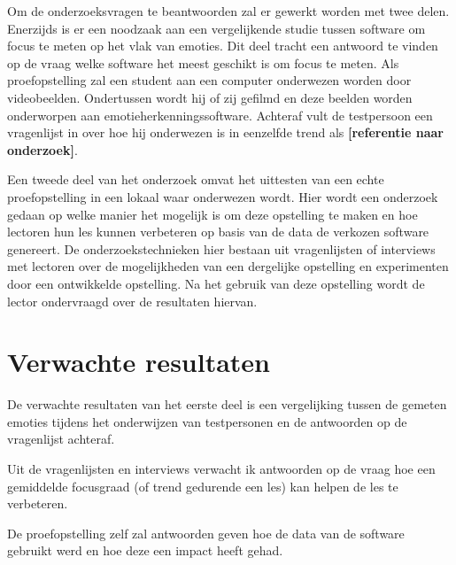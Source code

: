 Om de onderzoeksvragen te beantwoorden zal er gewerkt worden met twee delen. Enerzijds is er een noodzaak aan een vergelijkende studie tussen software om focus te meten op het vlak van emoties. Dit deel tracht een antwoord te vinden op de vraag welke software het meest geschikt is om focus te meten. Als proefopstelling zal een student aan een computer onderwezen worden door videobeelden. Ondertussen wordt hij of zij gefilmd en deze beelden worden onderworpen aan emotieherkenningssoftware. Achteraf vult de testpersoon een vragenlijst in over hoe hij onderwezen is in eenzelfde trend als \textbf{[referentie naar onderzoek]}.

Een tweede deel van het onderzoek omvat het uittesten van een echte proefopstelling in een lokaal waar onderwezen wordt. Hier wordt een onderzoek gedaan op welke manier het mogelijk is om deze opstelling te maken en hoe lectoren hun les kunnen verbeteren op basis van de data de verkozen software genereert. De onderzoekstechnieken hier bestaan uit vragenlijsten of interviews met lectoren over de mogelijkheden van een dergelijke opstelling en experimenten door een ontwikkelde opstelling. Na het gebruik van deze opstelling wordt de lector ondervraagd over de resultaten hiervan.


\section{Verwachte resultaten}
\label{sec:verwachte_resultaten}



De verwachte resultaten van het eerste deel is een vergelijking tussen de gemeten emoties tijdens het onderwijzen van testpersonen en de antwoorden op de vragenlijst achteraf. 

Uit de vragenlijsten en interviews verwacht ik antwoorden op de vraag hoe een gemiddelde focusgraad (of trend gedurende een les) kan helpen de les te verbeteren.

De proefopstelling zelf zal antwoorden geven hoe de data van de software gebruikt werd en hoe deze een impact heeft gehad. 


